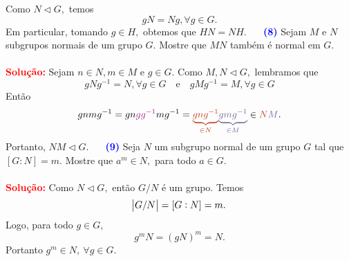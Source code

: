 \documentclass[12pt, a4paper]{article}
\newcommand{\sol}{\textbf{\textcolor{red}{Solução:}} }
\begin{document}
Como $N \lhd G,$ temos 
\[gN = Ng, \forall g \in G.\]
Em particular, tomando $g \in H,$ obtemos que $HN = NH.$
\textcolor{white}{Oi}\newline\newline
\textcolor{blue}{\bf(8)}\label{46}  Sejam $M$ e $N$ subgrupos normais de um grupo $G.$ Mostre que $MN$ também é normal em $G.$\\ \\
\sol Sejam $n \in N, m \in M$ e $g \in G.$ 
Como $M, N \lhd G,$ lembramos que
\[
gNg^{-1} = N, \forall g \in G \quad \mbox{e} \quad gMg^{-1} = M, \forall g \in G
\]
Então
\[
gnmg^{-1} = gn\textcolor{Mulberry}{gg^{-1}}mg^{-1} = \textcolor{Bittersweet}{\underbrace{gng^{-1}}_{\in N}} \textcolor{CadetBlue}{\underbrace{gmg^{-1}}_{\in M}} \in \textcolor{Bittersweet}{N}\textcolor{CadetBlue}{M}.
\]
Portanto, $NM \lhd G.$
\textcolor{white}{Oi}\newline\newline
\textcolor{blue}{\bf(9)}\label{47} Seja $N$ um subgrupo normal de um grupo $G$ tal que $[G : N] = m.$ Mostre que $a^m \in N,$ para todo $a \in G.$\\ \\
\sol Como $N \lhd G,$ então $G/N$ é um grupo. Temos
\[
\abs{G/N} = [G: N] = m.
\]
Logo, para todo $g \in G,$
\[
g^mN = (gN)^m = N.
\]
Portanto $g^m \in N, \ \forall g \in G.$ 
\end{document}

